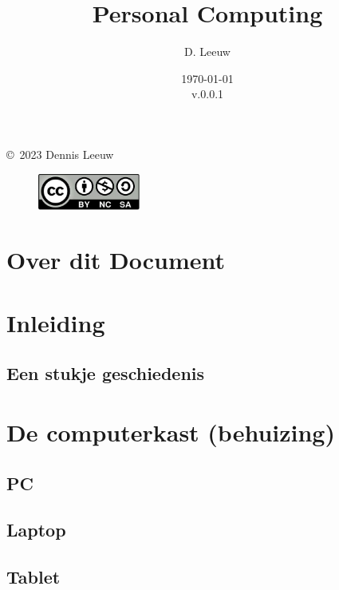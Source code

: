 \documentclass[a4paper,12pt,twoside,openright,titlepage]{book}
\author{D. Leeuw}
\title{Personal Computing}
\date{\today\\v.0.0.1}
\begin{document}

\maketitle

\copyright\ 2023 Dennis Leeuw\\

\begin{figure}
\includegraphics[width=0.3\textwidth]{CC-BY-SA-NC.png}
\end{figure}

\bigskip




\frontmatter
\chapter{Over dit Document}



\tableofcontents


\mainmatter
\chapter{Inleiding}

\section{Een stukje geschiedenis}


\chapter{De computerkast (behuizing)}
\section{PC}
\section{Laptop}
\section{Tablet}
\end{document}
